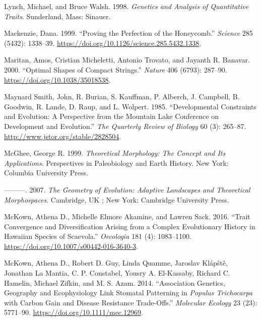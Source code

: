 \documentclass[
  12pt,
]{article}
\newlength{\cslhangindent}
\newlength{\cslentryspacingunit} %
\newenvironment{CSLReferences}[2] %
 {%
  \setlength{\parindent}{0pt}
  \ifodd #1
  \let\oldpar\par
  \def\par{\hangindent=\cslhangindent\oldpar}
  \fi
  \setlength{\parskip}{#2\cslentryspacingunit}
 }%
 {}
\begin{document}
\begin{CSLReferences}{1}{0}
\leavevmode{}%
Lynch, Michael, and Bruce Walsh. 1998. \emph{Genetics and Analysis of Quantitative Traits}. Sunderland, Mass: Sinauer.

\leavevmode{}%
Mackenzie, Dana. 1999. {``Proving the {Perfection} of the {Honeycomb}.''} \emph{Science} 285 (5432): 1338--39. \url{https://doi.org/10.1126/science.285.5432.1338}.

\leavevmode{}%
Maritan, Amos, Cristian Micheletti, Antonio Trovato, and Jayanth R. Banavar. 2000. {``Optimal Shapes of Compact Strings.''} \emph{Nature} 406 (6793): 287--90. \url{https://doi.org/10.1038/35018538}.

\leavevmode{}%
Maynard Smith, John, R. Burian, S. Kauffman, P. Alberch, J. Campbell, B. Goodwin, R. Lande, D. Raup, and L. Wolpert. 1985. {``Developmental {Constraints} and {Evolution}: {A} {Perspective} from the {Mountain} {Lake} {Conference} on {Development} and {Evolution}.''} \emph{The Quarterly Review of Biology} 60 (3): 265--87. \url{http://www.jstor.org/stable/2828504}.

\leavevmode{}%
McGhee, George R. 1999. \emph{Theoretical Morphology: The Concept and Its Applications}. Perspectives in Paleobiology and Earth History. New York: Columbia University Press.

\leavevmode{}%
---------. 2007. \emph{The Geometry of Evolution: Adaptive Landscapes and Theoretical Morphospaces}. Cambridge, UK ; New York: Cambridge University Press.

\leavevmode{}%
McKown, Athena D., Michelle Elmore Akamine, and Lawren Sack. 2016. {``Trait Convergence and Diversification Arising from a Complex Evolutionary History in {Hawaiian} Species of {Scaevola}.''} \emph{Oecologia} 181 (4): 1083--1100. \url{https://doi.org/10.1007/s00442-016-3640-3}.

\leavevmode{}%
McKown, Athena D., Robert D. Guy, Linda Quamme, Jaroslav Klápště, Jonathan La Mantia, C. P. Constabel, Yousry A. El-Kassaby, Richard C. Hamelin, Michael Zifkin, and M. S. Azam. 2014. {``Association Genetics, Geography and Ecophysiology Link Stomatal Patterning in \emph{{Populus} Trichocarpa} with Carbon Gain and Disease Resistance Trade-Offs.''} \emph{Molecular Ecology} 23 (23): 5771--90. \url{https://doi.org/10.1111/mec.12969}.


\end{CSLReferences}
\end{document}
